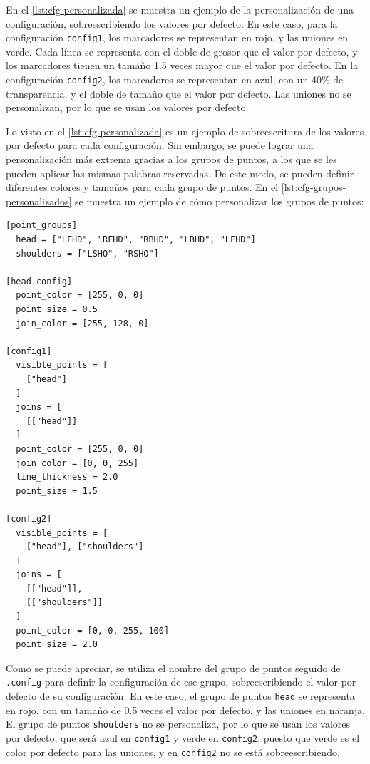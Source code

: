 En el \autoref{lst:cfg-personalizada} se muestra un ejemplo de la personalización de una configuración, sobreescribiendo los valores por defecto. En este caso, para la configuración \texttt{config1}, los marcadores se representan en rojo, y las uniones en verde. Cada línea se representa con el doble de grosor que el valor por defecto, y los marcadores tienen un tamaño 1.5 veces mayor que el valor por defecto. En la configuración \texttt{config2}, los marcadores se representan en azul, con un 40\% de transparencia, y el doble de tamaño que el valor por defecto. Las uniones no se personalizan, por lo que se usan los valores por defecto.

Lo visto en el \autoref{lst:cfg-personalizada} es un ejemplo de sobreescritura de los valores por defecto para cada configuración. Sin embargo, se puede lograr una personalización más extrema gracias a los grupos de puntos, a los que se les pueden aplicar las mismas palabras reservadas. De este modo, se pueden definir diferentes colores y tamaños para cada grupo de puntos. En el \autoref{lst:cfg-grupos-personalizados} se muestra un ejemplo de cómo personalizar los grupos de puntos:

\begin{lstlisting}[style=mystyle, caption={Configuración personalizada de grupos de puntos}, label={lst:cfg-grupos-personalizados}]
[point_groups]
  head = ["LFHD", "RFHD", "RBHD", "LBHD", "LFHD"]
  shoulders = ["LSHO", "RSHO"]

[head.config]
  point_color = [255, 0, 0]
  point_size = 0.5
  join_color = [255, 128, 0]

[config1]
  visible_points = [
    ["head"]
  ]
  joins = [
    [["head"]]
  ]
  point_color = [255, 0, 0]
  join_color = [0, 0, 255]
  line_thickness = 2.0
  point_size = 1.5

[config2]
  visible_points = [
    ["head"], ["shoulders"]
  ]
  joins = [
    [["head"]], 
    [["shoulders"]]
  ]
  point_color = [0, 0, 255, 100]
  point_size = 2.0
\end{lstlisting}

Como se puede apreciar, se utiliza el nombre del grupo de puntos seguido de \texttt{.config} para definir la configuración de ese grupo, sobreescribiendo el valor por defecto de su configuración. En este caso, el grupo de puntos \texttt{head} se representa en rojo, con un tamaño de 0.5 veces el valor por defecto, y las uniones en naranja. El grupo de puntos \texttt{shoulders} no se personaliza, por lo que se usan los valores por defecto, que será azul en \texttt{config1} y verde en \texttt{config2}, puesto que verde es el color por defecto para las uniones, y en \texttt{config2} no se está sobreescribiendo.

